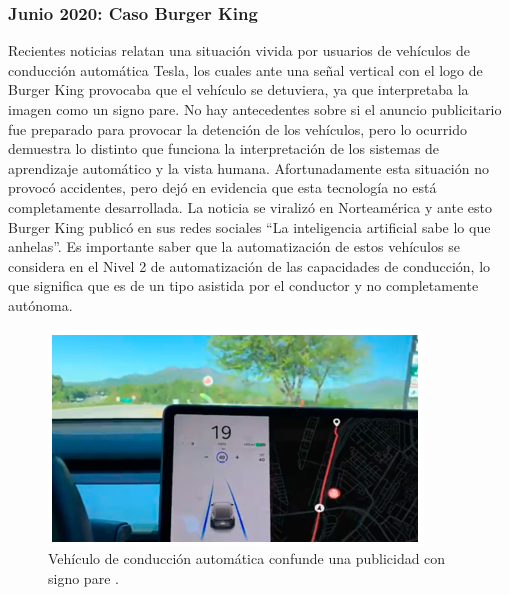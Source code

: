 \subsubsection{Junio 2020: Caso Burger King}
Recientes noticias \parencite{r57} relatan una situación vivida por usuarios de vehículos de conducción automática Tesla, los cuales ante una señal vertical con el logo de Burger King provocaba que el vehículo se detuviera, ya que interpretaba la imagen como un signo pare. No hay antecedentes sobre si el anuncio publicitario fue preparado para provocar la detención de los vehículos, pero lo ocurrido demuestra lo distinto que funciona la interpretación de los sistemas de aprendizaje automático y la vista humana. Afortunadamente esta situación no provocó accidentes, pero dejó en evidencia que esta tecnología no está completamente desarrollada. La noticia se viralizó en Norteamérica y ante esto Burger King publicó en sus redes sociales “La inteligencia artificial sabe lo que anhelas”.
Es importante saber que la automatización de estos vehículos se considera en el Nivel 2 de automatización de las capacidades de conducción, lo que significa que es de un tipo asistida por el conductor y no completamente autónoma.

\begin{figure}[th]
\centering
\includegraphics [scale = 1] {Figures/figura_31.PNG}
\decoRule
\caption[Vehículo de conducción automática confunde una publicidad con signo pare]{Vehículo de conducción automática confunde una publicidad con signo pare \parencite{r57}.}
\label{fig:31}
\end{figure}